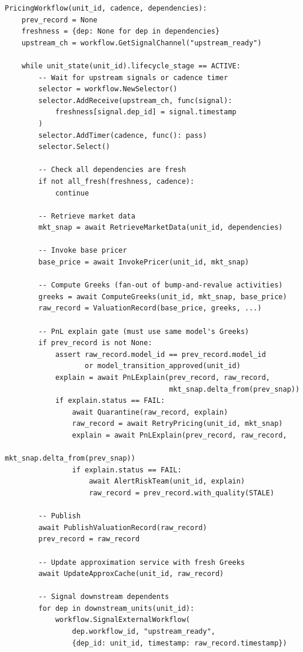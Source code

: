 \documentclass[11pt,a4paper]{article}
\begin{document}
\begin{lstlisting}
PricingWorkflow(unit_id, cadence, dependencies):
    prev_record = None
    freshness = {dep: None for dep in dependencies}
    upstream_ch = workflow.GetSignalChannel("upstream_ready")

    while unit_state(unit_id).lifecycle_stage == ACTIVE:
        -- Wait for upstream signals or cadence timer
        selector = workflow.NewSelector()
        selector.AddReceive(upstream_ch, func(signal):
            freshness[signal.dep_id] = signal.timestamp
        )
        selector.AddTimer(cadence, func(): pass)
        selector.Select()

        -- Check all dependencies are fresh
        if not all_fresh(freshness, cadence):
            continue

        -- Retrieve market data
        mkt_snap = await RetrieveMarketData(unit_id, dependencies)

        -- Invoke base pricer
        base_price = await InvokePricer(unit_id, mkt_snap)

        -- Compute Greeks (fan-out of bump-and-revalue activities)
        greeks = await ComputeGreeks(unit_id, mkt_snap, base_price)
        raw_record = ValuationRecord(base_price, greeks, ...)

        -- PnL explain gate (must use same model's Greeks)
        if prev_record is not None:
            assert raw_record.model_id == prev_record.model_id
                   or model_transition_approved(unit_id)
            explain = await PnLExplain(prev_record, raw_record,
                                       mkt_snap.delta_from(prev_snap))
            if explain.status == FAIL:
                await Quarantine(raw_record, explain)
                raw_record = await RetryPricing(unit_id, mkt_snap)
                explain = await PnLExplain(prev_record, raw_record,
                                           mkt_snap.delta_from(prev_snap))
                if explain.status == FAIL:
                    await AlertRiskTeam(unit_id, explain)
                    raw_record = prev_record.with_quality(STALE)

        -- Publish
        await PublishValuationRecord(raw_record)
        prev_record = raw_record

        -- Update approximation service with fresh Greeks
        await UpdateApproxCache(unit_id, raw_record)

        -- Signal downstream dependents
        for dep in downstream_units(unit_id):
            workflow.SignalExternalWorkflow(
                dep.workflow_id, "upstream_ready",
                {dep_id: unit_id, timestamp: raw_record.timestamp})
\end{lstlisting}
\end{document}
